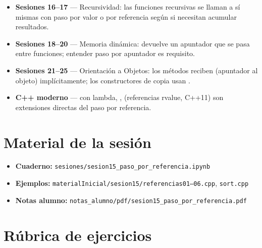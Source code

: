 \documentclass[12pt, oneside]{article}
\begin{document}
\begin{itemize}
  \item \textbf{Sesiones 16--17} — Recursividad: las funciones recursivas
        se llaman a sí mismas con paso por valor o por referencia según si
        necesitan acumular resultados.
  \item \textbf{Sesiones 18--20} — Memoria dinámica:  devuelve un
        apuntador que se pasa entre funciones; entender paso por apuntador
        es requisito.
  \item \textbf{Sesiones 21--25} — Orientación a Objetos: los métodos reciben
         (apuntador al objeto) implícitamente; los constructores de
        copia usan .
  \item \textbf{C++ moderno} —  con lambda, ,
         (referencias rvalue, C++11) son extensiones directas
        del paso por referencia.
\end{itemize}

\section{Material de la sesión}

\begin{itemize}
  \item \textbf{Cuaderno:}
        \texttt{sesiones/sesion15\_paso\_por\_referencia.ipynb}
  \item \textbf{Ejemplos:}
        \texttt{materialInicial/sesion15/referencias01--06.cpp}, \texttt{sort.cpp}
  \item \textbf{Notas alumno:}
        \texttt{notas\_alumno/pdf/sesion15\_paso\_por\_referencia.pdf}
\end{itemize}

\section{Rúbrica de ejercicios}
\end{document}
